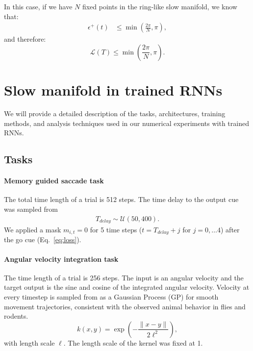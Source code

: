 \documentclass{article} %
\newcounter{ct}
\theoremstyle{definition}
\theoremstyle{remark}
\begin{document}
In this case, if we have \(N\) fixed points in the ring-like slow manifold, we know that:
\begin{equation}
\begin{split}
     \epsilon^+(t) &\leq \min \left( \frac{2 \pi}{N}, \pi \right),
\end{split}
\end{equation}and therefore:
\begin{equation}
    \mathcal{L}(T) \leq \min \left( \frac{2 \pi}{N}, \pi \right).
\end{equation}
\newpage
\section{Slow manifold in trained RNNs}
We will provide a detailed description of the tasks, architectures, training methods, and analysis techniques used in our numerical experiments with trained RNNs.
\subsection{Tasks}\label{sec:supp:tasks}
\paragraph{Memory guided saccade task}

The total time length of a trial is 512 steps.
The time delay to the output cue was sampled from
\begin{align}
T_{delay} \sim \mathcal{U}(50, 400).
\end{align}We applied a mask \(m_{i, t}=0\) for 5 time steps (\(t = T_{delay}+j\) for \(j = 0,\dots 4\)) after the go cue (Eq.~\ref{eq:loss}).



\paragraph{Angular velocity integration task}
The time length of a trial is 256 steps.
The input is an angular velocity and the target output is the sine and cosine of the integrated angular velocity.
Velocity at every timestep  is sampled from as a Gaussian Process (GP) for smooth movement trajectories, consistent with the observed animal behavior in flies and rodents.
\begin{equation}
k(x, y)=\exp\left(-\frac{\|x - y\|}{2\ell^{2}}\right),
\end{equation}with length scale \(\ell\).
 The length scale of the kernel was fixed at 1.
\end{document}
